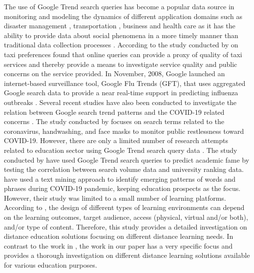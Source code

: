 \documentclass[11pt,a4paper,]{article}
\begin{document}
The use of Google Trend search queries has become a popular data source in monitoring and modeling the dynamics of different application domains such as disaster management \autocite{kam2019monitoring}, transportation \autocite{willis2020using}, business \autocite{chumnumpan2019understanding} and health care \autocite{nuti2014use,alicino2015assessing,arora2019google,carneiro2009google,cook2011assessing} as it has the ability to provide data about social phenomena in a more timely manner than traditional data collection processes \autocite{vaughan2014web}. According to the study conducted by \textcite{willis2020using} on taxi preferences found that online queries can provide a proxy of quality of taxi services and thereby provide a means to investigate service quality and public concerns on the service provided. In November, 2008, Google launched an internet-based surveillance tool, Google Flu Trends (GFT), that uses aggregated Google search data to provide a near real-time support in predicting influenza outbreaks \autocite{cook2011assessing}. Several recent studies have also been conducted to investigate the relation between Google search trend patterns and the COVID-19 related concerns \autocite{husnayain2020applications,effenberger2020association}. The study conducted by \textcite{husnayain2020applications} focuses on search terms related to the coronavirus, handwashing, and face masks to monitor public restlessness toward COVID-19. However, there are only a limited number of research attempts related to education sector using Google Trend search query data \autocite{vaughan2014web}. The study conducted by \textcite{vaughan2014web} have used Google Trend search queries to predict academic fame by testing the correlation between search volume data and university ranking data. \textcite{kansal2021google} have used a text mining approach to identify emerging patterns of words and phrases during COVID-19 pandemic, keeping education prospects as the focus. However, their study was limited to a small number of learning platforms. According to \textcite{moore2011learning}, the design of different types of learning environments can depend on the learning outcomes, target audience, access (physical, virtual and/or both), and/or type of content. Therefore, this study provides a detailed investigation on distance education solutions focusing on different distance learning needs. In contrast to the work in \textcite{kansal2021google}, the work in our paper has a very specific focus and provides a thorough investigation on different distance learning solutions available for various education purposes.
\end{document}
